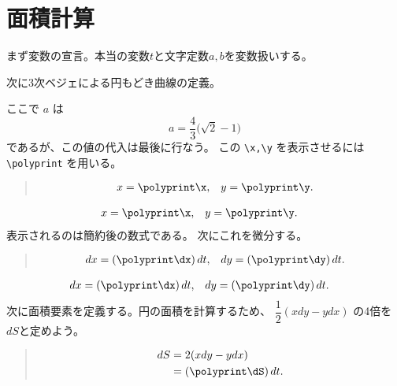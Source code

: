 \documentclass{jsarticle}
\begin{document}
\section{面積計算}
まず変数の宣言。本当の変数$t$と文字定数$a,b$を変数扱いする。
\begin{quote}
\begin{boxedverbatim}
\end{boxedverbatim}
\end{quote}
次に3次ベジェによる円もどき曲線の定義。
\polydefine{}
\polydefine{}
\begin{quote}
\begin{boxedverbatim}
\polydefine{}
\polydefine{}
\end{boxedverbatim}
\end{quote}
ここで $a$ は
\[
  a=\dfrac43\bigl(\sqrt2-1\bigr)
\]
であるが、この値の代入は最後に行なう。
この \verb+\x,\y+ を表示させるには \verb+\polyprint+ を用いる。
\begin{quote}
\begin{boxedverbatim}
\begin{align*}
  x &= \polyprint\x, & y &= \polyprint\y.
\end{align*}    
\end{boxedverbatim}
\end{quote}
\begin{align*}
  x &= \polyprint\x, & y &= \polyprint\y.
\end{align*}
表示されるのは簡約後の数式である。
\newpage
次にこれを微分する。
\polydiff{}\x  \polydiff{}\y
\begin{quote}
\begin{boxedverbatim}
\polydiff{}\x  \polydiff{}\y
\begin{align*}
  dx &= (\polyprint\dx)\,dt, & dy &= (\polyprint\dy)\,dt.
\end{align*}    
\end{boxedverbatim}
\end{quote}
\begin{align*}
  dx &= (\polyprint\dx)\,dt, & dy &= (\polyprint\dy)\,dt.
\end{align*}    
次に面積要素を定義する。円の面積を計算するため、
$\dfrac12(xdy-ydx)$ の4倍を$dS$と定めよう。
\begin{quote}
\begin{boxedverbatim}
\polymul\dSA\x\dy  \polymul\dSB\y\dx
\polysub\dS\dSA\dSB \polymul{}\dS
\begin{align*}
 dS &=2(xdy-ydx)\\
    &=(\polyprint\dS)\,dt.
\end{align*}
\end{boxedverbatim}
\end{quote}
\end{document}
